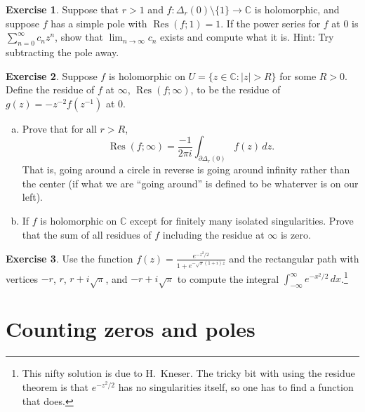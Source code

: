 \documentclass[12pt,openany]{book}
\newcommand{\sabs}[1]{\lvert {#1} \rvert}
\newcommand{\C}{{\mathbb{C}}}
\newcommand{\myquote}[1]{``#1''}
\theoremstyle{plain}
\theoremstyle{remark}
\theoremstyle{definition}
\newenvironment{exbox}{%
    \def\FrameCommand{\vrule width 1pt \relax\hspace{10pt}}%
    \MakeFramed{\advance\hsize-\width\FrameRestore}%
}{%
    \endMakeFramed
}
\newenvironment{exparts}{%
    \leavevmode\begin{enumerate}[a),noitemsep,topsep=0pt,parsep=0pt,partopsep=0pt]
}{%
    \end{enumerate}
}
\theoremstyle{exercise}
\newtheorem{exercise}{Exercise}[section]
\theoremstyle{example}
\begin{document}
\begin{savenotes}
\begin{exbox}
\begin{exercise}
Suppose that $r > 1$ and $f \colon \Delta_r(0) \setminus \{ 1 \} \to \C$ is
holomorphic, and suppose $f$ has a simple pole with $\operatorname{Res}(f;1) = 1$.
If the power series for $f$ at 0 is $\sum_{n=0}^\infty c_n z^n$, show that
$\lim_{n\to \infty} c_n$ exists and compute what it is.  Hint: Try
subtracting the pole away.
\end{exercise}

\begin{exercise}
Suppose $f$ is holomorphic on $U = \{ z \in \C : \sabs{z} > R \}$ for 
some $R > 0$.  Define the residue of $f$ at $\infty$,
$\operatorname{Res}(f;\infty)$, to be the residue
of $g(z) = -z^{-2} f(z^{-1})$ at $0$.
\begin{exparts}
\item
Prove that for all $r > R$,
\begin{equation*}
\operatorname{Res}(f;\infty) = \frac{-1}{2\pi i} \int_{\partial \Delta_r(0)}
f(z) \, dz .
\end{equation*}
That is, going around a circle in reverse is going around infinity rather
than the center (if what we are \myquote{going around} is defined to be whaterver
is on our left).
\item
If $f$ is holomorphic on $\C$ except for finitely many isolated
singularities.  Prove that the sum of all residues of $f$ including the
residue at $\infty$ is zero.
\end{exparts}
\end{exercise}

\begin{exercise}
Use the function $f(z) = \frac{e^{-z^2/2}}{1+e^{-\sqrt{\pi}(1+i)z}}$ and
the rectangular path with vertices $-r$, $r$, $r+i\sqrt{\pi}$,
and $-r+i\sqrt{\pi}$
to compute the integral $\int_{-\infty}^\infty e^{-x^2/2} \, dx$.\footnote{%
This nifty solution is due to H.\ Kneser. The tricky bit with using the
residue theorem is that $e^{-z^2/2}$ has no singularities itself,
so one has to find a function that does.}
\end{exercise}
\end{exbox}
\end{savenotes}


\section{Counting zeros and poles}
\end{document}
